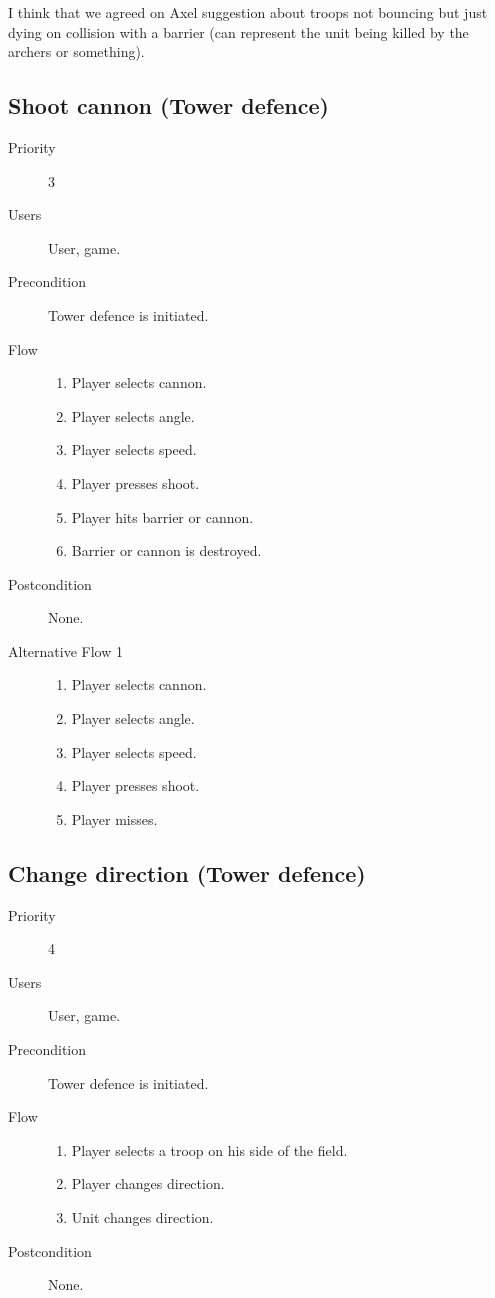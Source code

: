 \documentclass[12pt,a4paper]{article}
\begin{document}
\begin{todo}
  I think that we agreed on Axel suggestion about troops not bouncing
  but just dying on collision with a barrier (can represent the unit
  being killed by the archers or something).
\end{todo}

\subsection{Shoot cannon (Tower defence)}
\begin{description}
\item[Priority] 3
\item[Users] User, game.
\item[Precondition] Tower defence is initiated.
\item[Flow]\mbox{}
  \begin{enumerate}
  \item Player selects cannon.
  \item Player selects angle.
  \item Player selects speed.
  \item Player presses shoot.
  \item Player hits barrier or cannon.
  \item Barrier or cannon is destroyed.
  \end{enumerate}
\item[Postcondition] None.
\item[Alternative Flow 1]\mbox{}
  \begin{enumerate}
  \item Player selects cannon.
  \item Player selects angle.
  \item Player selects speed.
  \item Player presses shoot.
  \item Player misses.
  \end{enumerate}
\end{description}

\subsection{Change direction (Tower defence)}
\begin{description}
\item[Priority] 4
\item[Users] User, game.
\item[Precondition] Tower defence is initiated.
\item[Flow]\mbox{}
  \begin{enumerate}
  \item Player selects a troop on his side of the field.
  \item Player changes direction.
  \item Unit changes direction.
  \end{enumerate}
\item[Postcondition] None.
\end{description}
\end{document}
